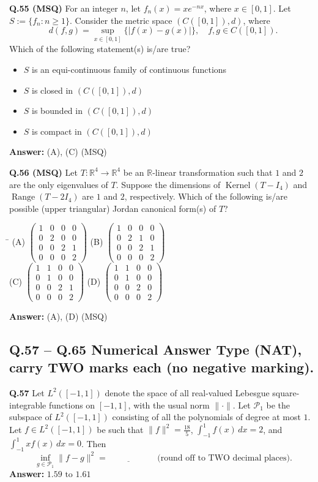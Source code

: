 \documentclass[11pt,a4paper]{article}
\newcommand{\optsfourA}[4]{%
  \begin{tabbing}
    \hspace{0.48\linewidth}\=\kill
    (A) #1 \> (B) #2 \\[2pt]
    (C) #3 \> (D) #4
  \end{tabbing}%
}
\newcommand{\optslistA}[4]{%
  \begin{itemize}
    \setlength{\itemsep}{2pt}\setlength{\parskip}{0pt}
    \item[(A)] #1
    \item[(B)] #2
    \item[(C)] #3
    \item[(D)] #4
  \end{itemize}%
}
\newcommand{\ans}[1]{\textbf{Answer:} #1\par\medskip}
\begin{document}
\textbf{Q.55 (MSQ)} For an integer $n$, let $f_n(x) = x e^{-nx}$, where $x \in [0, 1]$. Let $S := \{f_n : n \ge 1\}$. Consider the metric space $(C([0, 1]), d)$, where
\[
  d(f, g) = \sup_{x \in [0, 1]} \{|f(x) - g(x)|\}, \quad f, g \in C([0, 1]).
\]
Which of the following statement(s) is/are true?
\optslistA{$S$ is an equi-continuous family of continuous functions}{$S$ is closed in $(C([0, 1]), d)$}{$S$ is bounded in $(C([0, 1]), d)$}{$S$ is compact in $(C([0, 1]), d)$}
\ans{(A), (C) (MSQ)}

\textbf{Q.56 (MSQ)} Let $T : \mathbb{R}^4 \to \mathbb{R}^4$ be an $\mathbb{R}$-linear transformation such that $1$ and $2$ are the only eigenvalues of $T$. Suppose the dimensions of $\operatorname{Kernel}(T - I_4)$ and $\operatorname{Range}(T - 2I_4)$ are $1$ and $2$, respectively. Which of the following is/are possible (upper triangular) Jordan canonical form(s) of $T$?
\optsfourA{$\begin{pmatrix} 1 & 0 & 0 & 0 \\ 0 & 2 & 0 & 0 \\ 0 & 0 & 2 & 1 \\ 0 & 0 & 0 & 2 \end{pmatrix}$}{$\begin{pmatrix} 1 & 0 & 0 & 0 \\ 0 & 2 & 1 & 0 \\ 0 & 0 & 2 & 1 \\ 0 & 0 & 0 & 2 \end{pmatrix}$}{$\begin{pmatrix} 1 & 1 & 0 & 0 \\ 0 & 1 & 0 & 0 \\ 0 & 0 & 2 & 1 \\ 0 & 0 & 0 & 2 \end{pmatrix}$}{$\begin{pmatrix} 1 & 1 & 0 & 0 \\ 0 & 1 & 0 & 0 \\ 0 & 0 & 2 & 0 \\ 0 & 0 & 0 & 2 \end{pmatrix}$}
\ans{(A), (D) (MSQ)}

\subsection*{Q.57 -- Q.65 Numerical Answer Type (NAT), carry TWO marks each (no negative marking).}

\textbf{Q.57} Let $L^2([-1, 1])$ denote the space of all real-valued Lebesgue square-integrable functions on $[-1, 1]$, with the usual norm $\|\cdot\|$. Let $\mathcal{P}_1$ be the subspace of $L^2([-1, 1])$ consisting of all the polynomials of degree at most $1$. Let $f \in L^2([-1, 1])$ be such that $\|f\|^2 = \frac{18}{5}$, $\int_{-1}^{1} f(x)\,dx = 2$, and $\int_{-1}^{1} x f(x)\,dx = 0$. Then
\[
  \inf_{g \in \mathcal{P}_1} \|f - g\|^2 = \underline{\hspace{2cm}} \quad \text{(round off to TWO decimal places)}.
\]
\ans{$1.59 \text{ to } 1.61$}
\end{document}
